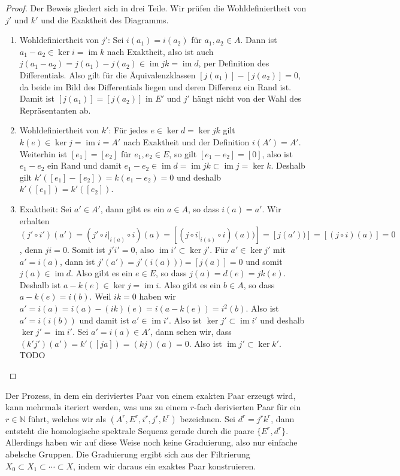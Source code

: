 \documentclass[12pt, hidelinks]{article}
\numberwithin{conj}{section}
\newcommand{\ima}{\operatorname{im}}
\begin{document}
\begin{proof}
    Der Beweis gliedert sich in drei Teile. Wir prüfen die Wohldefiniertheit von $j'$ und $k'$ und die Exaktheit des Diagramms.
    \begin{enumerate}[nolistsep]
        \item Wohldefiniertheit von $j'$: Sei $i(a_1) = i(a_2)$ für $a_1,a_2 \in A$. Dann ist $a_1-a_2 \in \ker i = \ima k$ nach Exaktheit, also ist auch $j(a_1-a_2) = j(a_1)-j(a_2) \in \ima jk = \ima d$, per Definition des Differentials. Also gilt für die Äquivalenzklassen $[j(a_1)]-[j(a_2)] = 0$, da beide im Bild des Differentials liegen und deren Differenz ein Rand ist. Damit ist $[j(a_1)] = [j(a_2)]$ in $E'$ und $j'$ hängt nicht von der Wahl des Repräsentanten ab.
        \item Wohldefiniertheit von $k'$: Für jedes $e \in \ker d = \ker jk$ gilt $k(e) \in \ker j = \ima i = A'$ nach Exaktheit und der Definition $i(A') = A'$. Weiterhin ist $[e_1] = [e_2]$ für $e_1,e_2 \in E$, so gilt $[e_1 - e_2] = [0]$, also ist $e_1-e_2$ ein Rand und damit $e_1 - e_2 \in \ima d = \ima jk \subset \ima j = \ker k$. Deshalb gilt $k'([e_1] - [e_2]) = k(e_1-e_2) = 0$ und deshalb $k'([e_1]) = k'([e_2])$.
        \item Exaktheit: Sei $a' \in A'$, dann gibt es ein $a \in A$, so dass $i(a) = a'$. Wir erhalten $(j'\circ i')(a') = (j'\circ i\vert_{i(a)} \circ i)(a) = [(j \circ i\vert_{i(a)} \circ i)(a))] = [j(a'))] = [(j\circ i)(a)] = 0$, denn $ji = 0$. Somit ist $j'i' = 0$, also $\ima i' \subset \ker j'$. Für $a' \in \ker j'$ mit $a' = i(a)$, dann ist $j'(a') = j'(i(a))) = [j(a)] = 0$ und somit $j(a) \in \ima d$. Also gibt es ein $e \in E$, so dass $j(a) = d(e) = jk(e)$. Deshalb ist $a-k(e) \in \ker j = \ima i$. Also gibt es ein $b \in A$, so dass $a-k(e) = i(b)$. Weil $ik = 0$ haben wir $a' = i(a) = i(a) - (ik)(e) = i(a-k(e)) = i^2(b)$. Also ist $a' = i(i(b))$ und damit ist $a' \in \ima i'$. Also ist $\ker j' \subset \ima i'$ und deshalb $\ker j' = \ima i'$. Sei $a' = i(a) \in A'$, dann sehen wir, dass $(k'j')(a') = k'([ja]) = (kj)(a) = 0$. Also ist $\ima j' \subset \ker k'$. TODO
    \end{enumerate}
\end{proof}

Der Prozess, in dem ein deriviertes Paar von einem exakten Paar erzeugt wird, kann mehrmals iteriert werden, was uns zu einem $r$-fach derivierten Paar für ein $r \in \mathbb{N}$ führt, welches wir als $(A^r, E^r,i^r,j^r,k^r)$ bezeichnen. Sei $d^r = j^r k^r$, dann entsteht die homologische spektrale Sequenz gerade durch die paare $\{E^r, d^r\}$. Allerdings haben wir auf diese Weise noch keine Graduierung, also nur einfache abelsche Gruppen. Die Graduierung ergibt sich aus der Filtrierung $X_0 \subset X_1 \subset \cdots \subset X$, indem wir daraus ein exaktes Paar konstruieren.
\end{document}
